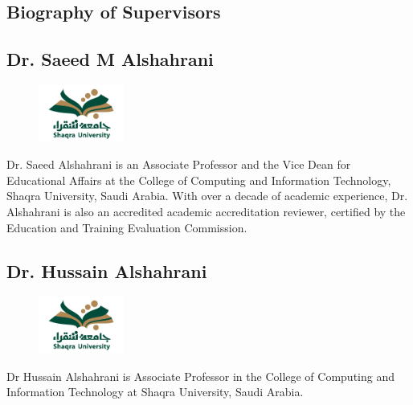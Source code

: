\documentclass[a4paper,12pt]{report}
\newenvironment{pageborder}{
  \begin{tcolorbox}[width=\textwidth, height=\textheight, colframe=black, colback=white, sharp corners, boxrule=0.5mm, nobeforeafter]
}{
  \end{tcolorbox}
}
\begin{document}
\begin{pageborder}
\end{pageborder}

\newpage
\begin{pageborder}
  \chapter{Biography of Supervisors}
  
  \section*{Dr. Saeed M Alshahrani}
  \begin{figure}
    \vspace{-10pt}
    \includegraphics[width=0.25\textwidth]{LOGO.jpg}  %
    \vspace{-20pt}
  \end{figure}
  Dr. Saeed Alshahrani is an Associate Professor and the Vice Dean for Educational Affairs at the College of Computing and Information Technology, Shaqra University, Saudi Arabia. With over a decade of academic experience, Dr. Alshahrani is also an accredited academic accreditation reviewer, certified by the Education and Training Evaluation Commission.

  \section*{Dr. Hussain Alshahrani}
  \begin{figure}
    \vspace{-10pt}
    \includegraphics[width=0.25\textwidth]{LOGO.jpg}  %
    \vspace{-20pt}
  \end{figure}
  Dr Hussain Alshahrani is Associate Professor in the College of Computing and Information Technology at Shaqra University, Saudi Arabia.

\end{pageborder}
\newpage
\end{document}
